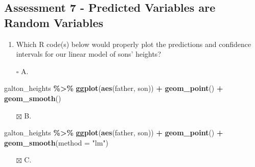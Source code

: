 \documentclass[
]{article}
\newenvironment{Shaded}{\begin{snugshade}}{\end{snugshade}}
\newcommand{\DataTypeTok}[1]{\textcolor[rgb]{0.13,0.29,0.53}{#1}}
\newcommand{\KeywordTok}[1]{\textcolor[rgb]{0.13,0.29,0.53}{\textbf{#1}}}
\newcommand{\NormalTok}[1]{#1}
\newcommand{\OperatorTok}[1]{\textcolor[rgb]{0.81,0.36,0.00}{\textbf{#1}}}
\newcommand{\StringTok}[1]{\textcolor[rgb]{0.31,0.60,0.02}{#1}}
\providecommand{\tightlist}{%
  \setlength{\itemsep}{0pt}\setlength{\parskip}{0pt}}
\begin{document}
\hypertarget{assessment-7---predicted-variables-are-random-variables}{%
\subsection{Assessment 7 - Predicted Variables are Random
Variables}\label{assessment-7---predicted-variables-are-random-variables}}

\begin{enumerate}
\def\labelenumi{\arabic{enumi}.}
\tightlist
\item
  Which R code(s) below would properly plot the predictions and
  confidence intervals for our linear model of sons' heights?
\end{enumerate}

\begin{itemize}
\tightlist
\item[$\square$]
  A.
\end{itemize}

\begin{Shaded}
\begin{Highlighting}[]
\NormalTok{galton\_heights }\OperatorTok{\%\textgreater{}\%}\StringTok{ }\KeywordTok{ggplot}\NormalTok{(}\KeywordTok{aes}\NormalTok{(father, son)) }\OperatorTok{+}
\StringTok{  }\KeywordTok{geom\_point}\NormalTok{() }\OperatorTok{+}
\StringTok{  }\KeywordTok{geom\_smooth}\NormalTok{()}
\end{Highlighting}
\end{Shaded}

\begin{itemize}
\tightlist
\item[$\boxtimes$]
  B.
\end{itemize}

\begin{Shaded}
\begin{Highlighting}[]
\NormalTok{galton\_heights }\OperatorTok{\%\textgreater{}\%}\StringTok{ }\KeywordTok{ggplot}\NormalTok{(}\KeywordTok{aes}\NormalTok{(father, son)) }\OperatorTok{+}
\StringTok{  }\KeywordTok{geom\_point}\NormalTok{() }\OperatorTok{+}
\StringTok{  }\KeywordTok{geom\_smooth}\NormalTok{(}\DataTypeTok{method =} \StringTok{"lm"}\NormalTok{)}
\end{Highlighting}
\end{Shaded}

\begin{itemize}
\tightlist
\item[$\boxtimes$]
  C.
\end{itemize}
\end{document}
